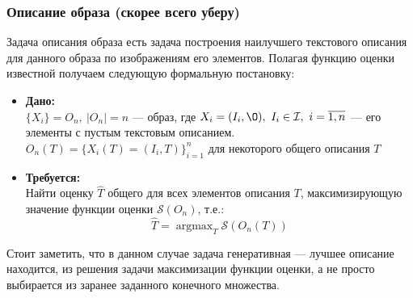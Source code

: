 \documentclass[a4paper,12pt]{article}
\DeclareMathOperator*{\argmax}{argmax}
\begin{document}
				\subsubsection{Описание образа (скорее всего уберу)}
				Задача описания образа есть задача построения наилучшего текстового описания для данного образа по изображениям его элементов. Полагая функцию оценки известной получаем следующую формальную постановку:\\
				\begin{itemize}
					\item \textbf{Дано:}\\
					$\{X_i\} = O_n, ~|O_n| = n$ --- образ, где $X_i = (I_i, \O),~I_i\in\mathcal{I},~i=\overline{1, n}$ --- его элементы с пустым текстовым описанием. \\
					$O_n(T) = \{X_i(T) = (I_i, T)\}_{i=1}^n$ для некоторого общего описания $T$\\
					\item \textbf{Требуется:}\\
					Найти оценку $\hat{T}$ общего для всех элементов описания $T$, максимизирующую значение функции оценки $\mathcal{S}(O_n)$, т.е.: \\
					$$\hat{T}= \argmax_{T}\mathcal{S}(O_n(T))$$
				\end{itemize}
				Стоит заметить, что в данном случае задача генеративная --- лучшее описание находится, из решения задачи максимизации функции оценки, а не просто выбирается из заранее заданного конечного множества.
				
			
\end{document}

